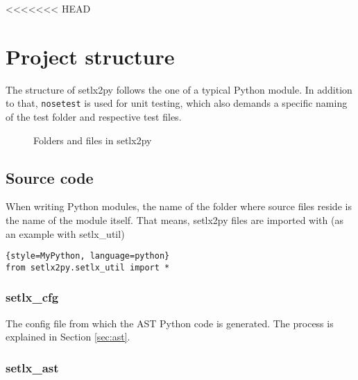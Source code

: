 <<<<<<< HEAD

\section{Project structure}

The structure of setlx2py follows the one of a typical Python module. In addition to that, \texttt{nosetest} is used for unit testing, which also demands a specific naming of the test folder and respective test files.

\begin{figure}[ht]
\caption{Folders and files in setlx2py}
\end{figure}

%
%
\clearpage
\subsection{Source code}

When writing Python modules, the name of the folder where source files reside is the name of the module itself. That means, setlx2py files are imported with (as an example with setlx\_util)

\begin{lstlisting}{style=MyPython, language=python}
from setlx2py.setlx_util import *
\end{lstlisting}

%
\subsubsection{setlx\_cfg}

The config file from which the AST Python code is generated. The process is explained in Section \ref{sec:ast}.

%
\subsubsection{setlx\_ast}

